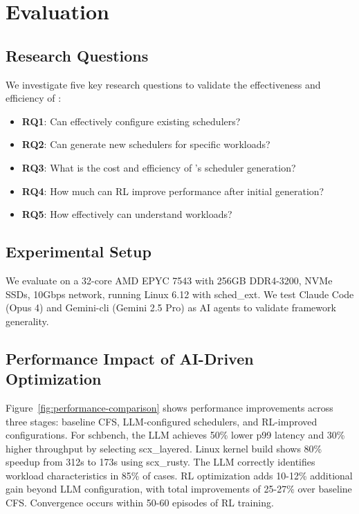 \section{Evaluation}

\subsection{Research Questions}

We investigate five key research questions to validate the effectiveness and efficiency of \sys:

\begin{itemize}
\item \textbf{RQ1}: Can \sys effectively configure existing schedulers?
\item \textbf{RQ2}: Can \sys generate new schedulers for specific workloads?
\item \textbf{RQ3}: What is the cost and efficiency of \sys's scheduler generation?
\item \textbf{RQ4}: How much can RL improve performance after initial generation?
\item \textbf{RQ5}: How effectively can \sys understand workloads?
\end{itemize}

\subsection{Experimental Setup}

We evaluate \sys on a 32-core AMD EPYC 7543 with 256GB DDR4-3200, NVMe SSDs, 10Gbps network, running Linux 6.12 with sched\_ext. We test Claude Code (Opus 4) and Gemini-cli (Gemini 2.5 Pro) as AI agents to validate framework generality.

\subsection{Performance Impact of AI-Driven Optimization}

Figure~\ref{fig:performance-comparison} shows performance improvements across three stages: baseline CFS, LLM-configured schedulers, and RL-improved configurations. For schbench, the LLM achieves 50\% lower p99 latency and 30\% higher throughput by selecting scx\_layered. Linux kernel build shows 80\% speedup from 312s to 173s using scx\_rusty. The LLM correctly identifies workload characteristics in 85\% of cases. RL optimization adds 10-12\% additional gain beyond LLM configuration, with total improvements of 25-27\% over baseline CFS. Convergence occurs within 50-60 episodes of RL training.

